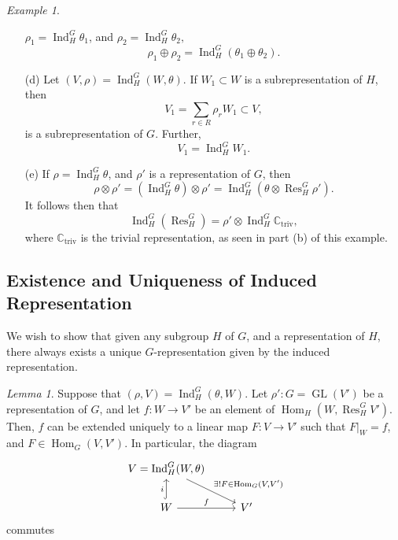 \documentclass[a4paper]{report}
\theoremstyle{definition}
\theoremstyle{remark}
\theoremstyle{proposition}
\theoremstyle{conjecture}
\theoremstyle{lemma}
\newtheorem{lemma}{Lemma}
\theoremstyle{corollary}
\theoremstyle{exercise}
\theoremstyle{example}
\newtheorem{example}{Example}
\newcommand{\C}{\mathbb{C}}
\newcommand{\on}{\operatorname}
\begin{document}
\begin{example}
\begin{itemize}
            $\rho_1 = \on{Ind}_H^G \theta_1$, and 
            $\rho_2 = \on{Ind}_H^G\theta_2,$
            $$\rho_1\oplus \rho_2 = \on{Ind}_H^G(\theta_1\oplus \theta_2).$$
        \item[(d)] Let $(V,\rho) = \on{Ind}_H^G(W,\theta)$.
            If $W_1 \subset W$ is a subrepresentation of $H$, then 
            $$V_1 = \sum_{r \in R} \rho_rW_1\subset V,$$
            is a subrepresentation of $G$. Further, 
            $$V_1 = \on{Ind}_H^G W_1.$$
        \item[(e)] If $\rho = \on{Ind}_H^G\theta$, and $\rho'$ is a 
            representation of $G$, then 
            $$\rho\otimes \rho' = (\on{Ind}_H^G\theta)\otimes \rho' = \on{Ind}_H^G(\theta\otimes \on{Res}_H^G\rho').$$
            It follows then that 
            $$\on{Ind}_H^G(\on{Res}_H^G) = \rho' \otimes \on{Ind}_H^G\C_{\on{triv}},$$
            where $\C_{\on{triv}}$ is the trivial representation, 
            as seen in part (b) of this example.
    \end{itemize}
\end{example}

\subsection{Existence and Uniqueness of Induced Representation}

We wish to show that given any subgroup $H$ of $G$, and a representation of 
$H$, there always exists a unique $G$-representation given by the induced 
representation.

\begin{lemma}\label{lemma_extend_to_ind}
    Suppose that $(\rho,V ) = \on{Ind}_H^G(\theta,W)$. 
    Let $\rho' : G = \on{GL}(V')$ be a representation of $G$, and let 
    $f : W \to V'$ be an element of $\on{Hom}_H(W,\on{Res}_H^GV')$.
    Then, $f$ can be extended uniquely
    to a linear map $F : V \to V'$ such that 
    $F\vert_W = f$, and $F \in \on{Hom}_G(V,V')$. In particular, the
    diagram $$%
\begin{tikzcd}
{V=\on{Ind}_H^G(W,\theta)} \arrow[rd, "{\exists! F\in\on{Hom}_G(V,V')}"] &    \\
W \arrow[u, "i", hook] \arrow[r, "f"]                                    & V'
\end{tikzcd}$$
commutes
\end{lemma}
\end{document}
